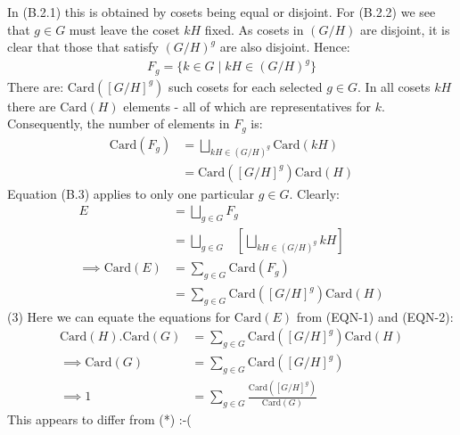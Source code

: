 \documentclass[12pt,a4paper]{article}
\begin{document}
In (B.2.1) this is obtained by cosets being equal or disjoint.  For (B.2.2) we see that $g \in G$ must leave the coset
$kH$ fixed.  As cosets in $(G/H)$ are disjoint, it is clear that those that satisfy $(G/H)^g$ are also disjoint.  Hence:
\begin{align*}
    F_g = \{k \in G \mid k H \in (G/H)^g \}
\end{align*}
There are: $\text{Card}([G/H]^g)$ such cosets for each selected $g \in G$.  In all cosets $kH$ there are $\text{Card}(H)$ elements - all of which are representatives for $k$.
Consequently, the number of elements in $F_g$ is:
\begin{align*}
    \text{Card}(F_g) &= \bigsqcup_{kH \in (G/H)^g} \text{Card}(kH) \\
    &= \text{Card}([G/H]^g) \text{Card}(H) \tag{B.3}
\end{align*}
Equation (B.3) applies to only one particular $g \in G$.  Clearly:
\begin{align*}
    E &= \bigsqcup_{g \in G} F_g \\
    &= \bigsqcup_{g \in G} \;\;\; \left[\bigsqcup_{kH \in (G/H)^g} kH \right] \\
    \implies \text{Card}(E) &= \sum_{g \in G} \text{Card}(F_g) \\
    &= \sum_{g \in G} \text{Card}([G/H]^g) \text{Card}(H) \tag{EQN-2}
\end{align*}
(3) Here we can equate the equations for $\text{Card}(E)$ from (EQN-1) and (EQN-2):
\begin{align*}
    \text{Card}(H) . \text{Card}(G) &= \sum_{g \in G} \text{Card}([G/H]^g) \text{Card}(H) \\
\implies \text{Card}(G) &= \sum_{g \in G} \text{Card}([G/H]^g) \\
\implies 1 &= \sum_{g \in G} \frac{\text{Card}([G/H]^g)}{\text{Card}(G)}
\end{align*}
This appears to differ from (*) :-(
\end{document}
